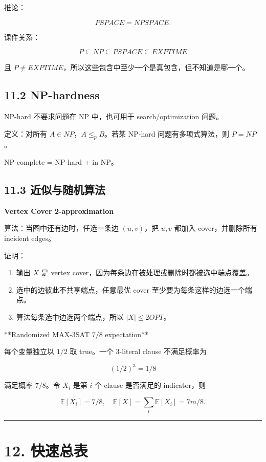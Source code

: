 ﻿\documentclass[UTF8,11pt]{ctexart}
\begin{document}
推论：

\[
PSPACE=NPSPACE.
\]


课件关系：

\[
P\subseteq NP\subseteq PSPACE\subseteq EXPTIME
\]

且 \(P\ne EXPTIME\)，所以这些包含中至少一个是真包含，但不知道是哪一个。


\subsection{11.2 NP-hardness}


NP-hard 不要求问题在 NP 中，也可用于 search/optimization 问题。  

定义：对所有 \(A\in NP\)，\(A\le_p B\)。若某 NP-hard 问题有多项式算法，则 \(P=NP\)。


NP-complete = NP-hard + in NP。


\subsection{11.3 近似与随机算法}


\textbf{Vertex Cover 2-approximation}


算法：当图中还有边时，任选一条边 \((u,v)\)，把 \(u,v\) 都加入 cover，并删除所有 incident edges。


证明：


\begin{enumerate}
\item 输出 \(X\) 是 vertex cover，因为每条边在被处理或删除时都被选中端点覆盖。
\item 选中的边彼此不共享端点，任意最优 cover 至少要为每条这样的边选一个端点。
\item 算法每条选中边选两个端点，所以 \(|X|\le2OPT\)。
\end{enumerate}


**Randomized MAX-3SAT \(7/8\) expectation**


每个变量独立以 \(1/2\) 取 true。一个 3-literal clause 不满足概率为

\[
(1/2)^3=1/8
\]

满足概率 \(7/8\)。令 \(X_i\) 是第 \(i\) 个 clause 是否满足的 indicator，则

\[
\mathbb E[X_i]=7/8,\quad
\mathbb E[X]=\sum_i\mathbb E[X_i]=7m/8.
\]


\bigskip\hrule\bigskip


\section{12. 快速总表}
\end{document}
